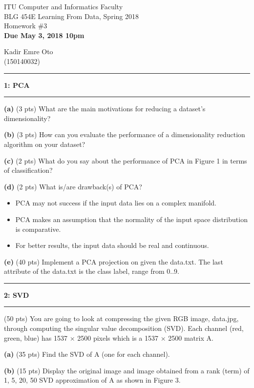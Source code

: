 \documentclass[11pt]{article}
\newcommand\question[2]{\vspace{.25in}\hrule\textbf{#1: #2}\vspace{.5em}\hrule\vspace{.10in}}
\renewcommand\part[1]{\vspace{.10in}\textbf{(#1)}}
\newcommand\header[4]{\begin{center}{#1} \\ {#2} \\ {#3} \\ \textbf{#4} \end{center}}
\begin{document}
\raggedright

\header
	{ITU Computer and Informatics Faculty}
	{BLG 454E Learning From Data, Spring 2018}
	{Homework \#3}
	{Due May 3, 2018 10pm}

\begin{center}
	Kadir Emre Oto \\
	(150140032)
\end{center}

\question{1}{PCA}

\part{a} (3 pts) What are the main motivations for reducing a dataset’s dimensionality?

\part{b} (3 pts) How can you evaluate the performance of a dimensionality reduction algorithm on your dataset?

\part{c} (2 pts) What do you say about the performance of PCA in Figure 1 in terms of classification?

\part{d} (2 pts) What is/are drawback(s) of PCA?
\begin{itemize}
	\item PCA may not success if the input data lies on a complex manifold. 
	\item PCA makes an assumption that the normality of the input space distribution is comparative. 
	\item For better results, the input data should be real and continuous.
\end{itemize}

\part{e} (40 pts) Implement a PCA projection on given the data.txt. The last attribute of the data.txt is the class label, range from 0..9.


\question{2}{SVD}

(50 pts) You are going to look at compressing the given RGB image, data.jpg, through computing the singular value decomposition (SVD). Each channel (red, green, blue) has 1537 × 2500 pixels which is a 1537 × 2500 matrix A.

\part{a} (35 pts) Find the SVD of A (one for each channel).

\part{b} (15 pts) Display the original image and image obtained from a rank (term) of 1, 5, 20, 50 SVD
approximation of A as shown in Figure 3.
\end{document}
